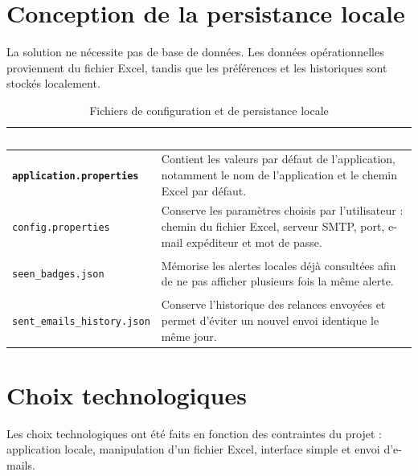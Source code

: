 \documentclass[12pt,a4paper,openany]{report}
\begin{document}
\section{Conception de la persistance locale}

La solution ne nécessite pas de base de données. Les données opérationnelles
proviennent du fichier Excel, tandis que les préférences et les historiques sont
stockés localement.

\begin{table}[H]
\centering
\small
\renewcommand{\arraystretch}{1.5}
\setlength{\arrayrulewidth}{1pt}

\begin{tabularx}{\textwidth}{|>{\raggedright\arraybackslash\bfseries}p{}|>{\raggedright\arraybackslash}X|}
\hline
\rowcolor{ondaBlue} 
\textcolor{white}{\textbf{Fichier}} & \textcolor{white}{\textbf{Rôle}} \\
\hline

\rowcolor{ondaBlue!5} 
\texttt{application.properties} & Contient les valeurs par défaut de l'application, notamment le nom de l'application et le chemin Excel par défaut. \\
\hline

\texttt{config.properties} & Conserve les paramètres choisis par l'utilisateur : chemin du fichier Excel, serveur SMTP, port, e-mail expéditeur et mot de passe. \\
\hline

\rowcolor{ondaBlue!5} 
\texttt{seen\_badges.json} & Mémorise les alertes locales déjà consultées afin de ne pas afficher plusieurs fois la même alerte. \\
\hline

\texttt{sent\_emails\_history.json} & Conserve l'historique des relances envoyées et permet d'éviter un nouvel envoi identique le même jour. \\
\hline

\end{tabularx}
\caption{Fichiers de configuration et de persistance locale}
\label{tab:fichiers-config}
\end{table}

\section{Choix technologiques}

Les choix technologiques ont été faits en fonction des contraintes du projet :
application locale, manipulation d'un fichier Excel, interface simple et envoi
d'e-mails.
\end{document}
